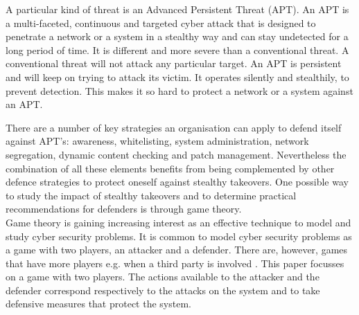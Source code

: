 A particular kind of threat is an Advanced Persistent Threat (APT). An APT is a multi-faceted, continuous and targeted cyber attack that is designed to penetrate a network or a system in a stealthy way and can stay undetected for a long period of time. It is different and more severe than a conventional threat. A conventional threat will not attack any particular target. An APT is persistent and will keep on trying to attack its victim. It operates silently and stealthily, to prevent detection. This makes it so hard to protect a network or a system against an APT. 



There are a number of key strategies an organisation can apply to defend itself against APT's: awareness, whitelisting, system administration, network segregation, dynamic content checking and patch management. Nevertheless the combination of all these elements benefits from being complemented by other defence strategies to protect oneself against stealthy takeovers. One possible way to study the impact of stealthy takeovers and to determine practical recommendations for defenders is through game theory.\\
Game theory is gaining increasing interest as an effective technique to model and study cyber security problems. It is common to model cyber security problems as a game with two players, an attacker and a defender. There are, however, games that have more players e.g. when a third party is involved \cite{fengstealthy}. This paper focusses on a game with two players. The actions available to the attacker and the defender correspond respectively to the attacks on the system and to take defensive measures that protect the system. \\

